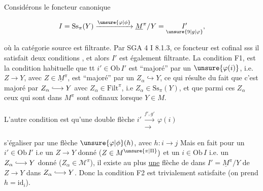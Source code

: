 



Considérons le foncteur canonique

\[
 I=\mathrm{Ss}_{\pi}(Y)\xrightarrow{\unsure{\varphi|\phi}}\underline M^\pi/Y=\underset{\unsure{9|g|\varphi}}{I'},
\]

où la catégorie source  est filtrante. Par SGA 4 I 8.1.3, ce foncteur est cofinal sss il satisfait deux conditions , et alors  $I'$ est également filtrante. La  condition F1,  est la condition habituelle que tt $i'\in\mathrm{Ob}\,I'$ est ``majoré'' par un $\unsure{\varphi(i)}$, i.e. \unsure{$\forall$} $Z\longrightarrow Y$, avec $Z\in\underline M^\pi$, est ``majoré'' par un  $Z_\alpha\hookrightarrow Y$,  ce qui résulte du fait que  c'est majoré par $Z_\alpha\lhook\joinrel\longrightarrow Y$ avec $Z_\alpha\in\mathrm{Filt}^{\pi}$,  i.e $Z_\alpha\in\mathrm{Ss}_\pi(Y)$, et que parmi ces $Z_\alpha$ ceux qui sont dans $M^\pi$ sont cofinaux lorsque $Y\in M$.


L'autre condition \unsure{*} est qu'une double flèche $i'\mathrel{\substack{\xrightarrow{f',g'}\\[-.5ex]\longrightarrow}}\varphi(i)$ 


s'égaliser par une flèche $\unsure{\varphi|\phi}(h)$, avec $h:i\longrightarrow j$  Mais en fait  pour un $i'\in\mathrm{Ob}\,I'$ i.e un $Z\longrightarrow Y$ donné ($Z\in M^{\unsure{\pi|\Pi}})$ et un $i\in\mathrm{Ob}\,I$ i.e. un $Z_\alpha\lhook\joinrel\longrightarrow Y$ donné ($Z_\alpha\in\mathcal M^\pi$), il existe au plus \uline{une} flèche de  dans $I'=\underline M^\pi/Y$ de $Z\longrightarrow Y$ dans $Z_\alpha\lhook\joinrel\longrightarrow Y$. Donc la condition F2 est trivialement satisfaite (on prend  $h=\mathrm{id}_i$).

